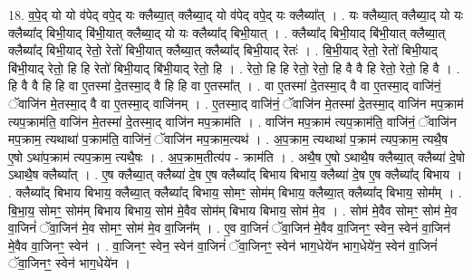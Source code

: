 \documentclass[17pt]{extarticle}
\begin{document}
18. व॒पे॒द् यो यो व॑पेद् वपे॒द् यः क्लैब्या॒त् क्लैब्या॒द् यो व॑पेद् वपे॒द् यः क्लैब्या᳚त् । . यः क्लैब्या॒त् क्लैब्या॒द् यो यः क्लैब्या᳚द् बिभी॒याद् बि॑भी॒यात् क्लैब्या॒द् यो यः क्लैब्या᳚द् बिभी॒यात् । . क्लैब्या᳚द् बिभी॒याद् बि॑भी॒यात् क्लैब्या॒त् क्लैब्या᳚द् बिभी॒याद् रेतो॒ रेतो॑ बिभी॒यात् क्लैब्या॒त् क्लैब्या᳚द् बिभी॒याद् रेतः॑ । . बि॒भी॒याद् रेतो॒ रेतो॑ बिभी॒याद् बि॑भी॒याद् रेतो॒ हि हि रेतो॑ बिभी॒याद् बि॑भी॒याद् रेतो॒ हि । . रेतो॒ हि हि रेतो॒ रेतो॒ हि वै वै हि रेतो॒ रेतो॒ हि वै । . हि वै वै हि हि वा ए॒तस्मा॑ दे॒तस्मा॒द् वै हि हि वा ए॒तस्मा᳚त् । . वा ए॒तस्मा॑ दे॒तस्मा॒द् वै वा ए॒तस्मा॒द् वाजि॑नं॒ ॅवाजि॑न मे॒तस्मा॒द् वै वा ए॒तस्मा॒द् वाजि॑नम् । . ए॒तस्मा॒द् वाजि॑नं॒ ॅवाजि॑न मे॒तस्मा॑ दे॒तस्मा॒द् वाजि॑न मप॒क्राम॑ त्यप॒क्राम॑ति॒ वाजि॑न मे॒तस्मा॑ दे॒तस्मा॒द् वाजि॑न मप॒क्राम॑ति । . वाजि॑न मप॒क्राम॑ त्यप॒क्राम॑ति॒ वाजि॑नं॒ ॅवाजि॑न मप॒क्राम॒ त्यथाथा॑ प॒क्राम॑ति॒ वाजि॑नं॒ ॅवाजि॑न मप॒क्राम॒त्यथ॑ । . अ॒प॒क्राम॒ त्यथाथा॑ प॒क्राम॑ त्यप॒क्राम॒ त्यथै॒ष ए॒षो ऽथा॑प॒क्राम॑ त्यप॒क्राम॒ त्यथै॒षः । . अ॒प॒क्राम॒तीत्य॑प - क्राम॑ति । . अथै॒ष ए॒षो ऽथाथै॒ष क्लैब्या॒त् क्लैब्या॑ दे॒षो ऽथाथै॒ष क्लैब्या᳚त् । . ए॒ष क्लैब्या॒त् क्लैब्या॑ दे॒ष ए॒ष क्लैब्या᳚द् बिभाय बिभाय॒ क्लैब्या॑ दे॒ष ए॒ष क्लैब्या᳚द् बिभाय । . क्लैब्या᳚द् बिभाय बिभाय॒ क्लैब्या॒त् क्लैब्या᳚द् बिभाय॒ सोमꣳ॒॒ सोम॑म् बिभाय॒ क्लैब्या॒त् क्लैब्या᳚द् बिभाय॒ सोम᳚म् । . बि॒भा॒य॒ सोमꣳ॒॒ सोम॑म् बिभाय बिभाय॒ सोम॑ मे॒वैव सोम॑म् बिभाय बिभाय॒ सोम॑ मे॒व । . सोम॑ मे॒वैव सोमꣳ॒॒ सोम॑ मे॒व वा॒जिनं॑ ॅवा॒जिन॑ मे॒व सोमꣳ॒॒ सोम॑ मे॒व वा॒जिन᳚म् । . ए॒व वा॒जिनं॑ ॅवा॒जिन॑ मे॒वैव वा॒जिनꣳ॒॒ स्वेन॒ स्वेन॑ वा॒जिन॑ मे॒वैव वा॒जिनꣳ॒॒ स्वेन॑ । . वा॒जिनꣳ॒॒ स्वेन॒ स्वेन॑ वा॒जिनं॑ ॅवा॒जिनꣳ॒॒ स्वेन॑ भाग॒धेये॑न भाग॒धेये॑न॒ स्वेन॑ वा॒जिनं॑ ॅवा॒जिनꣳ॒॒ स्वेन॑ भाग॒धेये॑न । \newline
\end{document}
